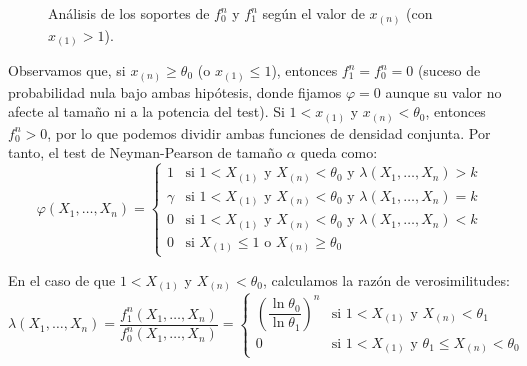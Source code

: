 \begin{ejercicio}
\begin{description}
\begin{figure}[h]
            \caption{Análisis de los soportes de $f_0^n$ y $f_1^n$ según el valor de $x_{(n)}$ (con $x_{(1)}>1$).}
            \label{fig:densidades_conjuntas_ej7.7.2}
        \end{figure}

        Observamos que, si $x_{(n)} \geq \theta_0$ (o $x_{(1)} \leq 1$), entonces $f_1^n = f_0^n = 0$ (suceso de probabilidad nula bajo ambas hipótesis, donde fijamos $\varphi = 0$ aunque su valor no afecte al tamaño ni a la potencia del test). Si $1 < x_{(1)}$ y $x_{(n)} < \theta_0$, entonces $f_0^n > 0$, por lo que podemos dividir ambas funciones de densidad conjunta. Por tanto, el test de Neyman-Pearson de tamaño $\alpha$ queda como:
        \begin{equation*}
            \varphi(X_1, \ldots, X_n) = \left\{\begin{array}{ll}
                1 & \text{si\ } 1 < X_{(1)} \text{\ y\ } X_{(n)} < \theta_0 \text{\ y\ } \lambda(X_1, \ldots, X_n) > k \\
                \gamma & \text{si\ } 1 < X_{(1)} \text{\ y\ } X_{(n)} < \theta_0 \text{\ y\ } \lambda(X_1, \ldots, X_n) = k \\
                0 & \text{si\ } 1 < X_{(1)} \text{\ y\ } X_{(n)} < \theta_0 \text{\ y\ } \lambda(X_1, \ldots, X_n) < k \\
                0 & \text{si\ } X_{(1)} \leq 1 \text{\ o\ } X_{(n)} \geq \theta_0
            \end{array}\right.
        \end{equation*}

        En el caso de que $1 < X_{(1)}$ y $X_{(n)} < \theta_0$, calculamos la razón de verosimilitudes:
        \begin{equation*}
            \lambda(X_1, \ldots, X_n) = \frac{f_1^n(X_1, \ldots, X_n)}{f_0^n(X_1, \ldots, X_n)} = \begin{cases}
                \left(\dfrac{\ln \theta_0}{\ln \theta_1}\right)^n & \text{si\ } 1 < X_{(1)} \text{\ y\ } X_{(n)} < \theta_1 \\[12pt]
                0 & \text{si\ } 1 < X_{(1)} \text{\ y\ } \theta_1 \leq X_{(n)} < \theta_0
            \end{cases}
        \end{equation*}


\end{description}
\end{ejercicio}
